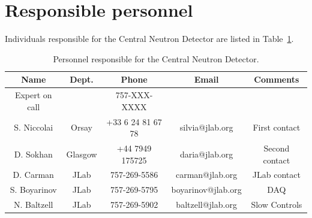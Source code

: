\documentclass[12pt]{article}
\begin{document}
\section{Responsible personnel}
Individuals responsible for the Central Neutron Detector are listed in Table~\ref{table_resp}. 
\begin{table}[h]
\begin{center}
\begin{tabular}{|c|c|c|c|c|}
\hline
Name & Dept. & Phone & Email & Comments\\
\hline
Expert on call & & 757-XXX-XXXX & & \\
\hline
S. Niccolai & Orsay & +33 6 24 81 67 78 & silvia@jlab.org & First contact\\
\hline
D. Sokhan & Glasgow & +44 7949 175725  & daria@jlab.org & Second contact\\
\hline
D. Carman & JLab & 757-269-5586 & carman@jlab.org & JLab contact\\
\hline
S. Boyarinov & JLab & 757-269-5795 & boyarinov@jlab.org & DAQ              \\ \hline
N. Baltzell  & JLab & 757-269-5902 & baltzell@jlab.org  & Slow Controls    \\ \hline
\end{tabular}
\caption{Personnel responsible for the Central Neutron Detector.}
\end{center}\label{table_resp}
\end{table}

\pagestyle{plain}
\end{document}

